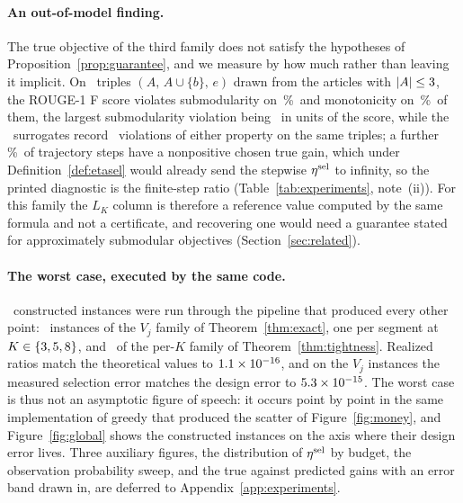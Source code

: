 \paragraph{An out-of-model finding.}
The true objective of the third family does not satisfy the hypotheses of
Proposition~\ref{prop:guarantee}, and we measure by how much rather than
leaving it implicit.  On \EThreeStructTriples\ triples
$(A,\,A\cup\{b\},\,e)$ drawn from the articles with
$|A|\le3$, the ROUGE-1 F score violates
submodularity on \EThreeSubmodViolPct\,\%\ and monotonicity on
\EThreeMonoViolPct\,\%\ of them, the largest submodularity violation being
\EThreeMaxSubmodViol\ in units of the score, while the
\EThreeNumSurrogates\ surrogates record \EThreeSurrogateViolCount\
violations of either property on the same triples; a further
\EThreeNonposPctKMain\,\%\ of trajectory steps have a nonpositive chosen
true gain, which under Definition~\ref{def:etasel} would already send the
stepwise $\eta^{\mathrm{sel}}$ to infinity, so the printed diagnostic is the
finite-step ratio
(Table~\ref{tab:experiments}, note~(ii)).  For this family the $L_K$ column
is therefore a reference value computed by the same formula and not a
certificate, and recovering one would need a guarantee stated for
approximately submodular objectives (Section~\ref{sec:related}).



\paragraph{The worst case, executed by the same code.}
\EFourNumInstances\ constructed instances were run through the pipeline that
produced every other point: \EFourNumVjInstances\ instances of the $V_j$
family of Theorem~\ref{thm:exact}, one per segment at $K\in\{3, 5, 8\}$,
and \EFourNumUKInstances\ of the per-$K$ family of
Theorem~\ref{thm:tightness}.  Realized ratios match the theoretical values to
$1.1\times 10^{-16}$, and on the $V_j$ instances the measured selection error
matches the design error to $5.3\times 10^{-15}$.  The worst case is thus
not an asymptotic figure of speech: it occurs point by point in the same
implementation of greedy that produced the scatter of
Figure~\ref{fig:money}, and Figure~\ref{fig:global} shows the constructed
instances on the axis where their design error lives.  Three auxiliary
figures, the distribution of
$\eta^{\mathrm{sel}}$ by budget, the observation probability sweep, and the true against
predicted gains with an error band drawn in, are deferred to
Appendix~\ref{app:experiments}.
